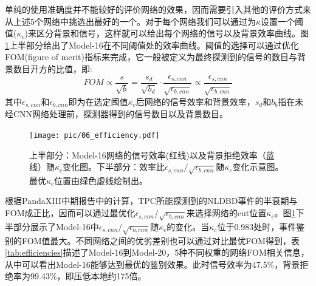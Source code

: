 单纯的使用准确度并不能较好的评价网络的效果，因而需要引入其他的评价方式来从上述5个网络中挑选出最好的一个。对于每个网络我们可以通过为$\kappa$设置一个阈值($\kappa_c$)来区分背景和信号，这样就可以给出每个网络的信号以及背景效率曲线。图\ref{fig:cnn_eff}上半部分给出了Model-16在不同阈值处的效率曲线。阈值的选择可以通过优化FOM(figure of merit)指标来完成，它一般被定义为最终探测到的信号的数目与背景数目开方的比值，即:
\begin{equation}
    FOM \propto \frac{s}{\sqrt{b}}=\frac{s_d}{\sqrt{b_d}}\cdot \frac{\epsilon_{s,cnn}}{\sqrt{\epsilon_{b,cnn}}}\propto \frac{\epsilon_{s,cnn}}{\sqrt{\epsilon_{b,cnn}}}
\end{equation}
其中$\epsilon_{s,cnn}$和$\epsilon_{b,cnn}$即为在选定阈值$\kappa_c$后网络的信号效率和背景效率，$s_d$和$b_b$指在未经CNN网络处理前，探测器得到的信号数目以及背景数目。

\begin{figure}
    \centering
    \texttt{[image: pic/06\_efficiency.pdf]}
    \caption{上半部分：Model-16网络的信号效率(红线)以及背景拒绝效率（蓝线）随$\kappa_c$变化图。下半部分：效率比$\epsilon_{s,cnn}/\sqrt{\epsilon_{b,cnn}}$随$\kappa_c$变化示意图。最优$\kappa_c$位置由绿色虚线绘制出。}
    \label{fig:cnn_eff}
\end{figure}

根据PandaXIII中期报告中的计算，TPC所能探测到的NLDBD事件的半衰期与FOM成正比，因而可以通过最优化$\epsilon_{s,cnn}/\sqrt{\epsilon_{b,cnn}}$来选择网络的cut位置$\kappa_c$。图\ref{fig:cnn_eff}下半部分展示了Model-16中$\epsilon_{s,cnn}/\sqrt{\epsilon_{b,cnn}}$随$\kappa_c$的变化。当$\kappa_c$位于0.983处时，事件鉴别的FOM值最大。不同网络之间的优劣差别也可以通过对比最优FOM得到，表\ref{tab:efficiencies}描述了Model-16到Model-20，5种不同权重的网络FOM相关信息，从中可以看出Model-16能够达到最优的鉴别效果。此时信号效率为47.5\%，背景拒绝率为99.43\%，即压低本地约175倍。

